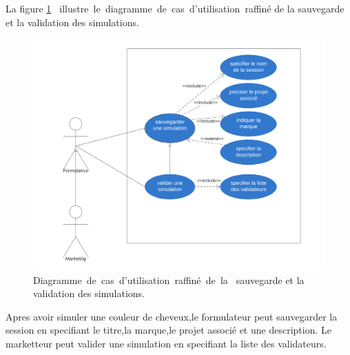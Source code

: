 La figure \ref{fig:diagCase5} \textcolor{white}{J}illustre\textcolor{white}{J}le\textcolor{white}{J}diagramme\textcolor{white}{J}de\textcolor{white}{J}cas\textcolor{white}{J}d’utilisation\textcolor{white}{J}raffiné de la sauvegarde et la validation des simulations.
\begin{figure}[!ht]\centering
\includegraphics[width=1.1\textwidth,angle=00]{chapitres/chapitre5/figures/Diagramme de cas d'utilisation (sauvegarde).png}
\caption{ Diagramme\textcolor{white}{J}de\textcolor{white}{J}cas\textcolor{white}{J}d’utilisation\textcolor{white}{J}raffiné\textcolor{white}{J}de\textcolor{white}{J}la\textcolor{white}{J} sauvegarde et la validation des simulations. }
\label{fig:diagCase5}
\end{figure}

Apres avoir simuler une couleur de cheveux,le formulateur peut sauvegarder la session en specifiant le titre,la marque,le projet associé et une description.
Le marketteur peut valider une simulation en specifiant la liste des validateurs.

